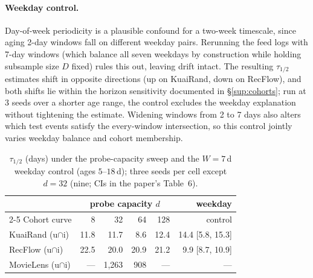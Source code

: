\documentclass[10pt,letterpaper]{article}
\begin{document}
\paragraph{Weekday control.}
Day-of-week periodicity is a plausible confound for a two-week timescale, since
aging 2-day windows fall on different weekday pairs. Rerunning the feed logs
with 7-day windows (which balance all seven weekdays by construction while
holding subsample size $D$ fixed) rules this out, leaving drift intact. The
resulting $\tau_{1/2}$ estimates shift in opposite directions (up on KuaiRand,
down on RecFlow), and both shifts lie within the horizon sensitivity documented
in \S\ref{sup:cohorts}; run at 3 seeds over a shorter age range, the control
excludes the weekday explanation without tightening the estimate. Widening
windows from 2 to 7 days also alters which test events satisfy the every-window
intersection, so this control jointly varies weekday balance and cohort
membership.

\begin{table}[t]
\centering
\caption{$\tau_{1/2}$ (days) under the probe-capacity sweep and the
$W = 7$\,d weekday control (ages $5$--$18$\,d); three seeds per cell except
$d = 32$ (nine; CIs in the paper's Table~6).}
\label{tab:invariance}
\small
\begin{tabular}{lrrrrr}
\toprule
& \multicolumn{4}{c}{probe capacity $d$} & weekday \\
\cmidrule(lr){2-5}
Cohort curve & 8 & 32 & 64 & 128 & control \\
\midrule
KuaiRand (u${\cap}$i) & 11.8 & 11.7 & 8.6 & 12.4 & 14.4 [5.8, 15.3] \\
RecFlow (u${\cap}$i) & 22.5 & 20.0 & 20.9 & 21.2 & 9.9 [8.7, 10.9] \\
MovieLens (u${\cap}$i) & --- & 1{,}263 & 908 & --- & --- \\
\bottomrule
\end{tabular}
\end{table}
\end{document}
